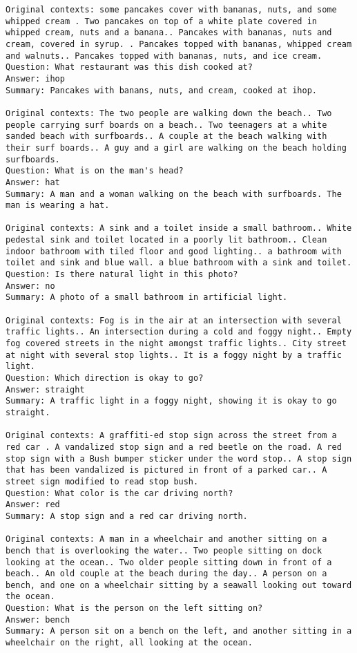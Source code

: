 \documentclass[10pt,twocolumn,letterpaper]{article}
\begin{document}
\begin{tiny}
\begin{lstlisting}[breaklines]
Original contexts: some pancakes cover with bananas, nuts, and some whipped cream . Two pancakes on top of a white plate covered in whipped cream, nuts and a banana.. Pancakes with bananas, nuts and cream, covered in syrup. . Pancakes topped with bananas, whipped cream and walnuts.. Pancakes topped with bananas, nuts, and ice cream.
Question: What restaurant was this dish cooked at?
Answer: ihop
Summary: Pancakes with banans, nuts, and cream, cooked at ihop.

Original contexts: The two people are walking down the beach.. Two people carrying surf boards on a beach.. Two teenagers at a white sanded beach with surfboards.. A couple at the beach walking with their surf boards.. A guy and a girl are walking on the beach holding surfboards.
Question: What is on the man's head?
Answer: hat
Summary: A man and a woman walking on the beach with surfboards. The man is wearing a hat.

Original contexts: A sink and a toilet inside a small bathroom.. White pedestal sink and toilet located in a poorly lit bathroom.. Clean indoor bathroom with tiled floor and good lighting.. a bathroom with toilet and sink and blue wall. a blue bathroom with a sink and toilet.
Question: Is there natural light in this photo?
Answer: no
Summary: A photo of a small bathroom in artificial light.

Original contexts: Fog is in the air at an intersection with several traffic lights.. An intersection during a cold and foggy night.. Empty fog covered streets in the night amongst traffic lights.. City street at night with several stop lights.. It is a foggy night by a traffic light.
Question: Which direction is okay to go?
Answer: straight
Summary: A traffic light in a foggy night, showing it is okay to go straight.

Original contexts: A graffiti-ed stop sign across the street from a red car . A vandalized stop sign and a red beetle on the road. A red stop sign with a Bush bumper sticker under the word stop.. A stop sign that has been vandalized is pictured in front of a parked car.. A street sign modified to read stop bush.
Question: What color is the car driving north?
Answer: red
Summary: A stop sign and a red car driving north.

Original contexts: A man in a wheelchair and another sitting on a bench that is overlooking the water.. Two people sitting on dock looking at the ocean.. Two older people sitting down in front of a beach.. An old couple at the beach during the day.. A person on a bench, and one on a wheelchair sitting by a seawall looking out toward the ocean.
Question: What is the person on the left sitting on?
Answer: bench
Summary: A person sit on a bench on the left, and another sitting in a wheelchair on the right, all looking at the ocean.


\end{lstlisting}
\end{tiny}
\end{document}
